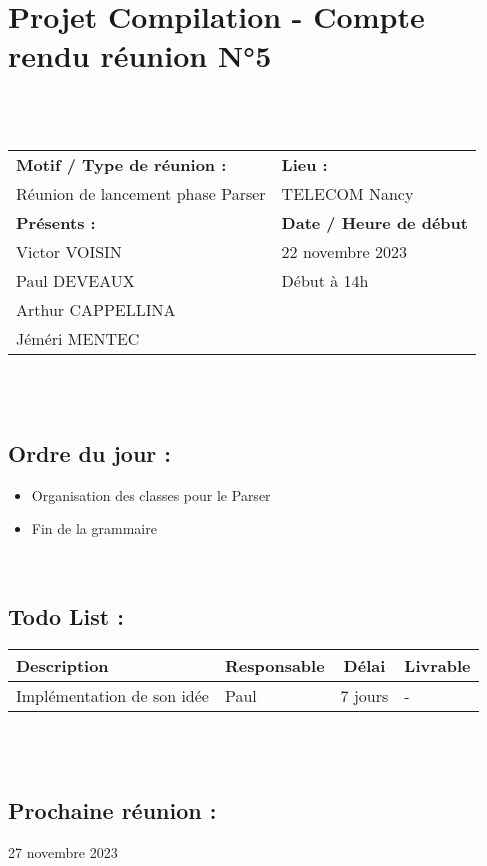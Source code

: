 \documentclass{article}
\begin{document}
\section*{Projet Compilation - Compte rendu réunion N°5}
~\\\\

\begin{tabular}{|p{7cm}|p{6cm}|}
    \hline
    \textbf{Motif / Type de réunion :}
    & \textbf{Lieu :}
    \\
    Réunion de lancement phase Parser
    &
    TELECOM Nancy
    \\ \hline
    \textbf{Présents :}
    &
    \textbf{Date / Heure de début}
    \\
    Victor VOISIN &  22 novembre 2023\\
    Paul DEVEAUX & Début à 14h\\
    Arthur CAPPELLINA & \\
    Jéméri MENTEC &
    \\ \hline
\end{tabular}
\\\\

\subsection*{Ordre du jour :}
\begin{itemize}
    \item{Organisation des classes pour le Parser}
    \item{Fin de la grammaire}
\end{itemize}
~

\subsection*{Todo List :}
\renewcommand{\arraystretch}{1.5}
\begin{tabular}{|p{5cm}|l|c|p{4.5cm}|}
    \hline
    Description & Responsable & Délai & Livrable\\ 
    \hline
    Implémentation de son idée & Paul & 7 jours & - \\
    \hline
\end{tabular}
\\\\

\subsection*{Prochaine réunion :} 27 novembre 2023
\end{document}
